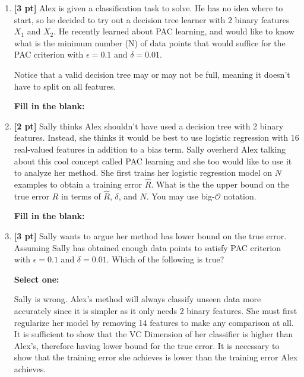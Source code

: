 \documentclass[12pt,addpoints,answers]{exam}
\begin{document}
\begin{enumerate}
    \clearpage
    
    \item \textbf{[3 pt]} Alex is given a classification task to solve. He has no idea where to start, so he decided to try out a decision tree learner with 2 binary features $X_1$ and $X_2$. He recently learned about PAC learning, and would like to know what is the minimum number (N) of data points that would suffice for the PAC criterion with $\epsilon = 0.1$ and $\delta = 0.01$. 
    
    Notice that a valid decision tree may or may not be full, meaning it doesn't have to split on all features.
    
    \textbf{Fill in the blank:}
    
    \begin{tcolorbox}[fit,height=1cm, width=4cm, blank, borderline={1pt}{-2pt},nobeforeafter]
    
    \end{tcolorbox} 
    
    
    
    \item \textbf{[2 pt]} Sally thinks Alex shouldn't have used a decision tree with 2 binary features. Instead, she thinks it would be best to use logistic regression with 16 real-valued features in addition to a bias term. Sally overherd Alex talking about this cool concept called PAC learning and she too would like to use it to analyze her method. She first trains her logistic regression model on $N$ examples to obtain a training error $\hat R$. What is the the upper bound on the true error $R$ in terms of $\hat R$, $\delta$, and $N$. You may use big-$\mathcal{O}$ notation.
    
    \textbf{Fill in the blank:}
    
    \begin{tcolorbox}[fit,height=1cm, width=15cm, blank, borderline={1pt}{-2pt},nobeforeafter]
    
    \end{tcolorbox} 
    
    
    \item \textbf{[3 pt]} Sally wants to argue her method has lower bound on the true error. Assuming Sally has obtained enough data points to satisfy PAC criterion with $\epsilon = 0.1$ and $\delta = 0.01$. Which of the following is true?
    
    \textbf{Select one:}
    \begin{checkboxes}
        \choice Sally is wrong. Alex's method will always classify unseen data more accurately since it is simpler as it only needs 2 binary features.
        \choice She must first regularize her model by removing 14 features to make any comparison at all.
        \choice It is sufficient to show that the VC Dimension of her classifier is higher than Alex's, therefore having lower bound for the true error.
        \choice It is necessary to show that the training error she achieves is lower than the training error Alex achieves.
    \end{checkboxes}
    

\end{enumerate}
\end{document}
